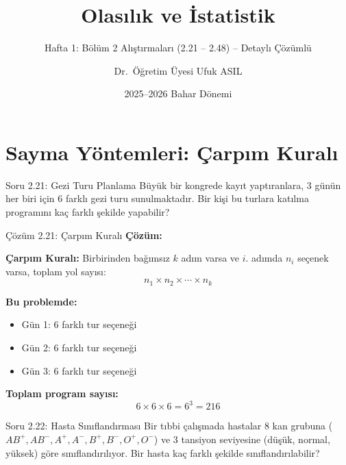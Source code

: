 \documentclass[light]{lutbeamer}
\institute[Yazılım Mühendisliği]{YAZILIM MÜHENDİSLİĞİ BÖLÜMÜ}
\author{Dr.~Öğretim Üyesi Ufuk ASIL}
\title{Olasılık ve İstatistik}
\subtitle{Hafta 1: Bölüm 2 Alıştırmaları (2.21 -- 2.48) -- Detaylı Çözümlü}
\date{2025--2026 Bahar Dönemi}
\begin{document}
\maketitle{}

\section{Sayma Yöntemleri: Çarpım Kuralı}

\begin{frame}{Soru 2.21: Gezi Turu Planlama}
    Büyük bir kongrede kayıt yaptıranlara, 3 günün her biri için 6 farklı gezi turu sunulmaktadır. Bir kişi bu turlara katılma programını kaç farklı şekilde yapabilir?
\end{frame}

\begin{frame}{Çözüm 2.21: Çarpım Kuralı}
    \color{blue}
    \textbf{Çözüm:}
    
    \textbf{Çarpım Kuralı:} Birbirinden bağımsız $k$ adım varsa ve $i$. adımda $n_i$ seçenek varsa, toplam yol sayısı:
    \[ n_1 \times n_2 \times \cdots \times n_k \]
    
    \vspace{0.3cm}
    \textbf{Bu problemde:}
    \begin{itemize}
        \item Gün 1: 6 farklı tur seçeneği
        \item Gün 2: 6 farklı tur seçeneği
        \item Gün 3: 6 farklı tur seçeneği
    \end{itemize}
    
    \vspace{0.3cm}
    \textbf{Toplam program sayısı:}
    \[ 6 \times 6 \times 6 = 6^3 = 216 \]
    
    \begin{center}
    \end{center}
\end{frame}

\begin{frame}{Soru 2.22: Hasta Sınıflandırması}
    Bir tıbbi çalışmada hastalar 8 kan grubuna ($AB^+, AB^-, A^+, A^-, B^+, B^-, O^+, O^-$) ve 3 tansiyon seviyesine (düşük, normal, yüksek) göre sınıflandırılıyor. Bir hasta kaç farklı şekilde sınıflandırılabilir?
\end{frame}
\end{document}
